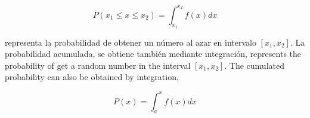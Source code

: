 \begin{equation*}
P(x_1 \leqslant x \leqslant x_2) = \int_{x_1}^{x_2}f(x)dx
\end{equation*}

\begin{paracol}{2}
\noindent representa la probabilidad de obtener un número al azar en intervalo $[x_1,x_2]$. 
La probabilidad acumulada, se obtiene también mediante integración,
\switchcolumn
\noindent represents the probability of get a random number in the interval $[x_1,x_2]$. The cumulated probability can also be obtained by integration,
\end{paracol} 

\begin{equation*}
P(x) = \int_a^xf(x)dx
\end{equation*}

